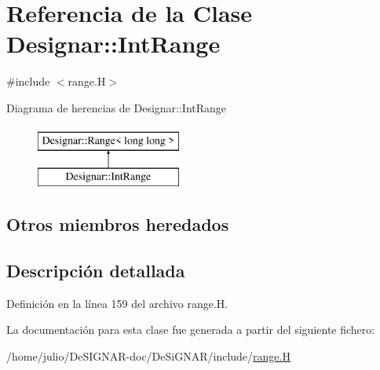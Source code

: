 \hypertarget{class_designar_1_1_int_range}{}\section{Referencia de la Clase Designar\+:\+:Int\+Range}
\label{class_designar_1_1_int_range}


{\ttfamily \#include $<$range.\+H$>$}

Diagrama de herencias de Designar\+:\+:Int\+Range\begin{figure}[H]
\begin{center}
\leavevmode
\includegraphics[height=2.000000cm]{class_designar_1_1_int_range}
\end{center}
\end{figure}
\subsection*{Otros miembros heredados}


\subsection{Descripción detallada}


Definición en la línea 159 del archivo range.\+H.



La documentación para esta clase fue generada a partir del siguiente fichero\+:\begin{DoxyCompactItemize}
\item 
/home/julio/\+De\+S\+I\+G\+N\+A\+R-\/doc/\+De\+Si\+G\+N\+A\+R/include/\hyperlink{range_8_h}{range.\+H}\end{DoxyCompactItemize}
